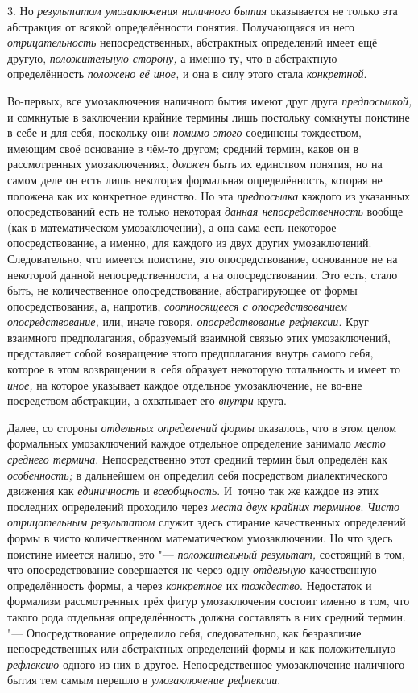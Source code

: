 3. Но {\em результатом
умозаключения наличного бытия} оказывается не только эта
абстракция от всякой определённости понятия. Получающаяся из него
{\em отрицательность}
непосредственных, абстрактных определений имеет ещё другую,
{\em положительную сторону,}
а именно ту, что в абстрактную определённость
{\em положено её иное,}
и она в силу этого стала
{\em конкретной}.

Во-первых, все умозаключения наличного бытия имеют друг друга
{\em предпосылкой,} и
сомкнутые в заключении крайние термины лишь постольку сомкнуты поистине в
себе и для себя, поскольку они {\em помимо этого}
соединены тождеством, имеющим своё основание в чём-то другом;
средний термин, каков он в рассмотренных умозаключениях, {\em должен} быть
их единством понятия, но на самом деле он есть лишь некоторая формальная
определённость, которая не положена как их конкретное единство. Но эта
{\em предпосылка} каждого из указанных опосредствований есть не только
некоторая {\em данная непосредственность}
вообще (как в математическом умозаключении), а она сама есть
некоторое опосредствование, а именно, для каждого из двух других
умозаключений. Следовательно, что имеется поистине, это опосредствование,
основанное не на некоторой данной непосредственности, а на
опосредствовании. Это есть, стало быть, не количественное опосредствование,
абстрагирующее от формы опосредствования, а, напротив,
{\em соотносящееся с опосредствованием
опосредствование,} или, иначе говоря, {\em опосредствование рефлексии}.
Круг взаимного предполагания, образуемый взаимной связью этих
умозаключений, представляет собой возвращение этого предполагания внутрь
самого себя, которое в этом возвращении в~себя образует некоторую
тотальность и имеет то {\em иное,}
на которое указывает каждое отдельное умозаключение, не
во-вне посредством абстракции, а охватывает его {\em внутри} круга.

Далее, со стороны {\em отдельных определений формы}
оказалось, что в этом целом формальных умозаключений каждое
отдельное определение занимало {\em место среднего термина}.
Непосредственно этот средний термин был определён как {\em особенность;} в
дальнейшем он определил себя посредством диалектического движения как
{\em единичность} и {\em всеобщность}.
И~точно так же каждое из этих последних определений проходило через
{\em места двух крайних терминов}. {\em Чисто отрицательным результатом}
служит здесь стирание качественных определений формы в чисто
количественном математическом умозаключении. Но что здесь поистине имеется
налицо, это "--- {\em положительный
результат,} состоящий в том, что опосредствование
совершается не через одну {\em отдельную}
качественную определённость формы, а через
{\em конкретное} их {\em тождество}.
Недостаток и формализм рассмотренных трёх фигур умозаключения
состоит именно в том, что такого рода отдельная определённость должна
составлять в них средний термин. "--- Опосредствование
определило себя, следовательно, как безразличие непосредственных или
абстрактных определений формы и как положительную
{\em рефлексию} одного из них в другое. Непосредственное
умозаключение наличного бытия тем самым перешло в
{\em умозаключение рефлексии}.\label{bkm:bm110b}

